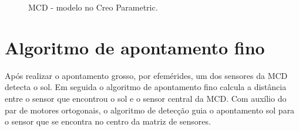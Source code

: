 \documentclass[a4paper,12pt]{article}
\begin{document}
\begin{figure}[h]
	
	\center
	\qquad
	\qquad
	\caption{MCD - modelo no Creo Parametric.}
	
\end{figure}
 \section{Algoritmo de apontamento fino}

Após realizar o apontamento grosso, por efemérides, um dos sensores da MCD detecta o sol. Em seguida o algoritmo de apontamento fino calcula a distância entre o sensor que encontrou o sol e o sensor central da MCD. Com auxílio do par de motores ortogonais, o algoritmo de detecção guia o apontamento sol para o sensor que se encontra no centro da matriz de sensores.
\end{document}
